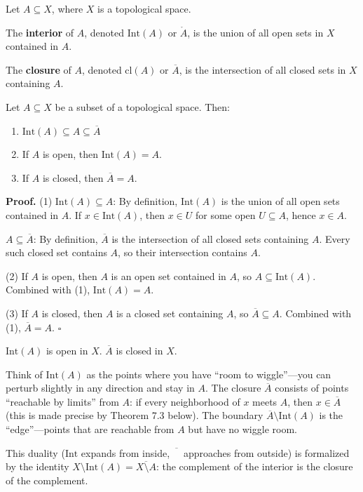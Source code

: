 \documentclass[11pt]{report}
\renewenvironment{proof}[1][Proof]{\noindent\textbf{#1.} }{\hfill$\square$\par\vspace{5pt}}
\begin{document}
\begin{defbox}
Let $A \subseteq X$, where $X$ is a topological space.

The \textbf{interior} of $A$, denoted $\text{Int}(A)$ or $\mathring{A}$, is the union of all open sets in $X$ contained in $A$.

The \textbf{closure} of $A$, denoted $\text{cl}(A)$ or $\overline{A}$, is the intersection of all closed sets in $X$ containing $A$.
\end{defbox}

\begin{lembox}
Let $A \subseteq X$ be a subset of a topological space. Then:
\begin{enumerate}
    \item $\text{Int}(A) \subseteq A \subseteq \overline{A}$
    \item If $A$ is open, then $\text{Int}(A) = A$.
    \item If $A$ is closed, then $\overline{A} = A$.
\end{enumerate}
\end{lembox}

\begin{proof}
(1) $\text{Int}(A) \subseteq A$: By definition, $\text{Int}(A)$ is the union of all open sets contained in $A$. If $x \in \text{Int}(A)$, then $x \in U$ for some open $U \subseteq A$, hence $x \in A$.

$A \subseteq \overline{A}$: By definition, $\overline{A}$ is the intersection of all closed sets containing $A$. Every such closed set contains $A$, so their intersection contains $A$.

(2) If $A$ is open, then $A$ is an open set contained in $A$, so $A \subseteq \text{Int}(A)$. Combined with (1), $\text{Int}(A) = A$.

(3) If $A$ is closed, then $A$ is a closed set containing $A$, so $\overline{A} \subseteq A$. Combined with (1), $\overline{A} = A$.
\end{proof}

\begin{rembox}
$\text{Int}(A)$ is open in $X$. $\overline{A}$ is closed in $X$.
\end{rembox}

\begin{rembox}
Think of $\text{Int}(A)$ as the points where you have ``room to wiggle''---you can perturb slightly in any direction and stay in $A$. The closure $\overline{A}$ consists of points ``reachable by limits'' from $A$: if every neighborhood of $x$ meets $A$, then $x \in \overline{A}$ (this is made precise by Theorem 7.3 below). The boundary $\overline{A} \setminus \text{Int}(A)$ is the ``edge''---points that are reachable from $A$ but have no wiggle room.

This duality ($\text{Int}$ expands from inside, $\overline{\phantom{A}}$ approaches from outside) is formalized by the identity $X \setminus \text{Int}(A) = \overline{X \setminus A}$: the complement of the interior is the closure of the complement.
\end{rembox}
\end{document}

